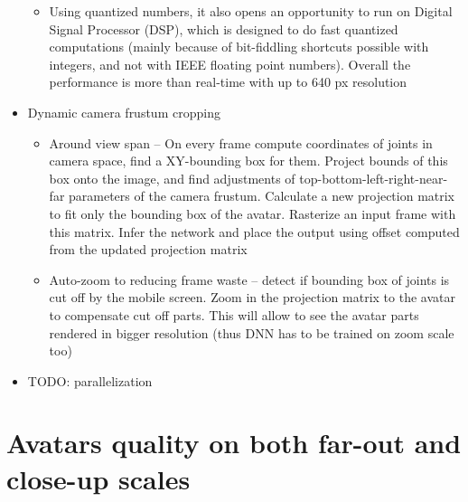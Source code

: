 \begin{itemize}
\begin{itemize}
		\item Using quantized numbers, it also opens an opportunity to run on Digital Signal Processor (DSP), which is designed to do fast quantized computations (mainly because of bit-fiddling shortcuts possible with integers, and not with IEEE floating point numbers). Overall the performance is more than real-time with up to 640 px resolution
	\end{itemize}
	\item Dynamic camera frustum cropping
		\begin{itemize}
			\item Around view span -- On every frame compute coordinates of joints in camera space, find a XY-bounding box for them. Project bounds of this box onto the image, and find adjustments of top-bottom-left-right-near-far parameters of the camera frustum. Calculate a new projection matrix to fit only the bounding box of the avatar. Rasterize an input frame with this matrix. Infer the network and place the output using offset computed from the updated projection matrix
			\item Auto-zoom to reducing frame waste -- detect if bounding box of joints is cut off by the mobile screen. Zoom in the projection matrix to the avatar to compensate cut off parts. This will allow to see the avatar parts rendered in bigger resolution (thus DNN has to be trained on zoom scale too)
		\end{itemize}
	
	\item \alert{TODO: parallelization}
\end{itemize}

\section{Avatars quality on both far-out and close-up scales}\label{methods:zooms}

